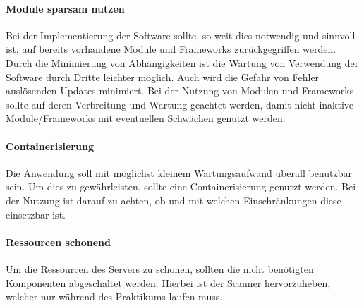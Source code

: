 \paragraph{Module sparsam nutzen}
Bei der Implementierung der Software sollte, so weit dies notwendig und sinnvoll ist, auf bereits vorhandene Module und Frameworks zurückgegriffen werden. Durch die Minimierung von Abhängigkeiten ist die Wartung von Verwendung der Software durch Dritte leichter möglich. Auch wird die Gefahr von Fehler auslösenden Updates minimiert. Bei der Nutzung von Modulen und Frameworks sollte auf deren Verbreitung und Wartung geachtet werden, damit nicht inaktive Module/Frameworks mit eventuellen Schwächen genutzt werden.

\paragraph{Containerisierung}
Die Anwendung soll mit möglichst kleinem Wartungsaufwand überall benutzbar sein. Um dies zu gewährleisten, sollte eine Containerisierung genutzt werden. Bei der Nutzung ist darauf zu achten, ob und mit welchen Einschränkungen diese einsetzbar ist.

\paragraph{Ressourcen schonend}
Um die Ressourcen des Servers zu schonen, sollten die nicht benötigten Komponenten abgeschaltet werden. Hierbei ist der Scanner hervorzuheben, welcher nur während des Praktikums laufen muss. 